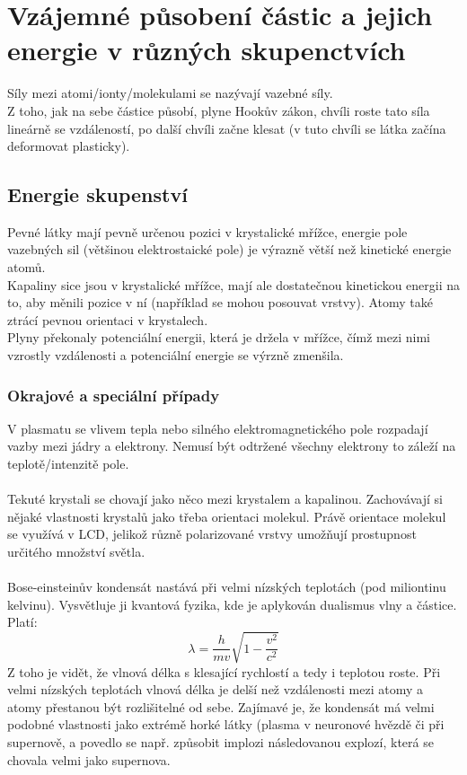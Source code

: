 \documentclass[titlepage]{report}
\begin{document}
\section{Vzájemné působení částic a jejich energie v různých skupenctvích}
Síly mezi atomi/ionty/molekulami se nazývají vazebné síly.\\
Z toho, jak na sebe částice působí, plyne Hookův zákon, chvíli roste tato síla lineárně se vzdáleností, po další chvíli začne klesat (v tuto chvíli se látka začína deformovat plasticky).\\
\subsection{Energie skupenství}
Pevné látky mají pevně určenou pozici v krystalické mřížce, energie pole vazebných sil (většinou elektrostaické pole) je výrazně větší než kinetické energie atomů.\\
Kapaliny sice jsou v krystalické mřížce, mají ale dostatečnou kinetickou energii na to, aby měnili pozice v ní (například se mohou posouvat vrstvy). Atomy také ztrácí pevnou orientaci v krystalech.\\
Plyny překonaly potenciální energii, která je držela v mřížce, čímž mezi nimi vzrostly vzdálenosti a potenciální energie se výrzně zmenšila.
\subsubsection{Okrajové a speciální případy}
V plasmatu se vlivem tepla nebo silného elektromagnetického pole rozpadají vazby mezi jádry a elektrony. Nemusí být odtržené všechny elektrony to záleží na teplotě/intenzitě pole.
\paragraph{}
Tekuté krystali se chovají jako něco mezi krystalem a kapalinou. Zachovávají si nějaké vlastnosti krystalů jako třeba orientaci molekul. Právě orientace molekul se využívá v LCD, jelikož různě polarizované vrstvy umožňují prostupnost určitého množství světla.
\paragraph{}
Bose-einsteinův kondensát nastává při velmi nízských teplotách (pod miliontinu kelvinu). Vysvětluje ji kvantová fyzika, kde je aplykován dualismus vlny a částice. Platí:\\
\begin{equation}
\lambda = \frac{h}{mv}\sqrt{1 - \frac{v^2}{c^2}}
\end{equation}
Z toho je vidět, že vlnová délka s klesající rychlostí a tedy i teplotou roste. Při velmi nízských teplotách vlnová délka je delší než vzdálenosti mezi atomy a atomy přestanou být rozlišitelné od sebe. Zajímavé je, že kondensát má velmi podobné vlastnosti jako extrémě horké látky (plasma v neuronové hvězdě či při supernově, a povedlo se např. způsobit implozi následovanou explozí, která se chovala velmi jako supernova.
\end{document}
